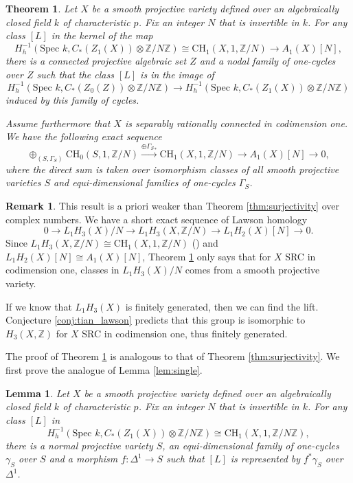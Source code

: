 \documentclass{amsart}
\newtheorem{thm}[theorem]{Theorem}
\newtheorem{lem}[theorem]{Lemma}
\theoremstyle{definition}
\newtheorem{rem}[theorem]{Remark}
\theoremstyle{remark}
\newcommand{\mbb}{\mathbb}
\newcommand{\ZZ}{\mbb{Z}}
\newcommand{\SP}{\text{Spec }}
\begin{document}
\begin{thm}\label{thm:sheaf_surj}
Let $X$ be a smooth projective variety defined over an algebraically closed field $k$ of characteristic $p$.
 Fix an integer $N$ that is invertible in $k$.
For any class $[L]$ in the kernel of the map
\[
H_h^{-1}(\SP k, C_* (Z_1(X))\otimes \ZZ/N\ZZ) \cong \text{CH}_1(X, 1, \ZZ/N) \to A_1(X)[N],
\]
there is a connected projective algebraic set $Z$ and a nodal family of one-cycles over $Z$ such that the class $[L]$ is in the image of 
\[
H_h^{-1}(\SP k, C_*(Z_0(Z))\otimes \ZZ/N \ZZ) \to H_h^{-1}(\SP k, C_* (Z_1(X)) \otimes \ZZ/N \ZZ)
\]
induced by this family of cycles.

Assume furthermore that $X$ is separably rationally connected in codimension one.
We have the following exact sequence
\[
\oplus_{(S, \Gamma_S)} \text{CH}_0(S,1, \ZZ/N)\xrightarrow{\oplus {\Gamma_S}_*} \text{CH}_1(X, 1, \ZZ/N)  \to A_1(X)[N] \to 0,
\]
where the direct sum is taken over isomorphism classes of all smooth projective varieties $S$ and equi-dimensional families of one-cycles $\Gamma_S$.
\end{thm}

\begin{rem}
This result is a priori weaker than Theorem \ref{thm:surjectivity} over complex numbers.
We have a short exact sequence of Lawson homology
\[
0 \to L_1H_3(X)/N \to L_1H_3(X, \ZZ/N) \to L_1H_2(X)[N]\to 0.
\]
Since $L_1H_3(X, \ZZ/N) \cong \text{CH}_1(X, 1, \ZZ/N)$ (\cite[Theorem 9.1]{Suslin_Voevodsky_homology}) and  $L_1H_2(X)[N] \cong A_1(X)[N]$, Theorem \ref{thm:sheaf_surj} only says that for $X$ SRC in codimension one, classes in $L_1H_3(X)/N$ comes from a smooth projective variety.

If we know that $L_1H_3(X)$ is finitely generated, then we can find the lift. Conjecture \ref{conj:tian_lawson} predicts that this group is isomorphic to $H_3(X, \ZZ)$ for $X$ SRC in codimension one, thus finitely generated.
\end{rem}

The proof of Theorem \ref{thm:sheaf_surj} is analogous to that of Theorem \ref{thm:surjectivity}.
We first prove the analogue of Lemma \ref{lem:single}.
\begin{lem}\label{lem:single_alg}
Let $X$ be a smooth projective variety defined over an algebraically closed field $k$ of characteristic $p$. Fix an integer $N$ that is invertible in $k$.
For any class $[L]$ in
\[
H_h^{-1}(\SP k, C_* (Z_1(X))\otimes \ZZ/N\ZZ) \cong \text{CH}_1(X, 1, \ZZ/N \ZZ),
\]
there is a normal projective variety $S$, an equi-dimensional family of one-cycles $\gamma_S$ over $S$ and a morphism $f: \Delta^1 \to S$ such that $[L]$ is represented by $f^*\gamma_S$ over $\Delta^1$.
\end{lem}
\end{document}
